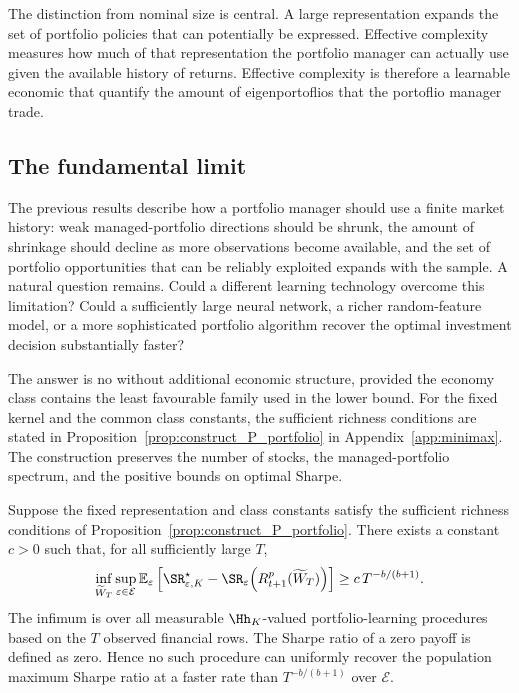 The distinction from nominal size is central. A large representation expands
the set of portfolio policies that can potentially be expressed. Effective
complexity measures how much of that representation the portfolio manager can
actually use given the available history of returns. Effective complexity is therefore a
learnable economic that quantify the amount of eigenportoflios that the portoflio manager trade.






\subsection{The fundamental limit}
\label{sec:minimax}

The previous results describe how a portfolio manager should use a finite
market history: weak managed-portfolio directions should be shrunk, the amount
of shrinkage should decline as more observations become available, and the
set of portfolio opportunities that can be reliably exploited expands with
the sample. A natural question remains. Could a different learning technology
overcome this limitation? Could a sufficiently large neural network, a richer
random-feature model, or a more sophisticated portfolio algorithm recover the
optimal investment decision substantially faster?

The answer is no without additional economic structure, provided the economy
class contains the least favourable family used in the lower bound. For the
fixed kernel and the common class constants, the sufficient richness
conditions are stated in Proposition~\ref{prop:construct_P_portfolio} in
Appendix~\ref{app:minimax}. The construction preserves the number of stocks,
the managed-portfolio spectrum, and the positive bounds on optimal Sharpe.

\begin{theorem}
\label{thm:minimax_words}
Suppose the fixed representation and class constants satisfy the sufficient
richness conditions of Proposition~\ref{prop:construct_P_portfolio}.
There exists a constant $c>0$ such that, for all sufficiently large $T$,
\[
\inf_{\widetilde W_T}\sup_{\varepsilon\in\mathcal E}
\mathbb E_\varepsilon\left[
\SR^\star_{\varepsilon,K}-\SR_\varepsilon\!\left(R^p_{t+1}(\widetilde W_T)\right)
\right]\geq c\,T^{-b/(b+1)}.
\]
The infimum is over all measurable $\Hh_K$-valued portfolio-learning
procedures based on the $T$ observed financial rows. The Sharpe ratio of a
zero payoff is defined as zero. Hence no such procedure can uniformly recover
the population maximum Sharpe ratio at a faster rate than $T^{-b/(b+1)}$
over $\mathcal E$.
\end{theorem}

